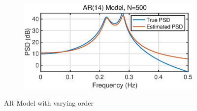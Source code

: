 \begin{figure}[htbp]
\begin{subfigure}[b]{0.35\textwidth}
     \end{subfigure}
     ~
     \begin{subfigure}[b]{0.35\textwidth}
         \centering
         \includegraphics[width=\textwidth]{fig/14/14b4.eps}
     \end{subfigure}
        \caption{AR Model with varying order}
        \label{fig:1_4_b}
\end{figure}
